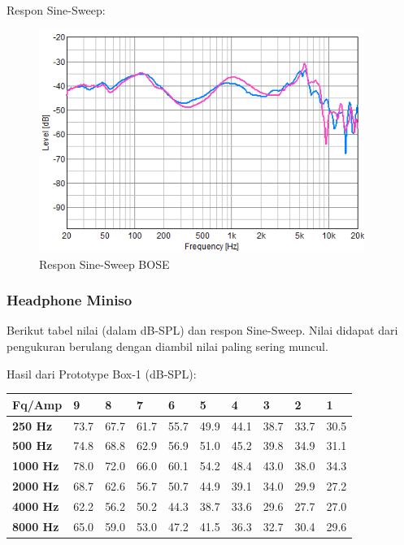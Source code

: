 \documentclass[12pt,]{article}
\begin{document}
	Respon Sine-Sweep:
	
	\begin{figure}[!ht]
		\centering
		\includegraphics[width=300pt]{images/respon/FP-Bose}
		\caption{Respon Sine-Sweep BOSE}
	\end{figure}

	\newpage
	\subsubsection{Headphone Miniso}
	
	Berikut tabel nilai (dalam dB-SPL) dan respon Sine-Sweep.
	Nilai didapat dari pengukuran berulang dengan diambil nilai paling sering muncul.
	
	Hasil dari Prototype Box-1 (dB-SPL):
	
	\begin{center}
		\begin{tabular}{|l|l|l|l|l|l|l|l|l|l|}
			\hline
			\textbf{Fq/Amp}  & \textbf{9} & \textbf{8} & \textbf{7} & \textbf{6} & \textbf{5} & \textbf{4} & \textbf{3} & \textbf{2} & \textbf{1} \\ \hline
			\textbf{250 Hz}  & 73.7       & 67.7       & 61.7       & 55.7       & 49.9       & 44.1       & 38.7       & 33.7       & 30.5       \\ \hline
			\textbf{500 Hz}  & 74.8       & 68.8       & 62.9       & 56.9       & 51.0       & 45.2       & 39.8       & 34.9       & 31.1       \\ \hline
			\textbf{1000 Hz} & 78.0       & 72.0       & 66.0       & 60.1       & 54.2       & 48.4       & 43.0       & 38.0       & 34.3       \\ \hline
			\textbf{2000 Hz} & 68.7       & 62.6       & 56.7       & 50.7       & 44.9       & 39.1       & 34.0       & 29.9       & 27.2       \\ \hline
			\textbf{4000 Hz} & 62.2       & 56.2       & 50.2       & 44.3       & 38.7       & 33.6       & 29.6       & 27.7       & 27.0       \\ \hline
			\textbf{8000 Hz} & 65.0       & 59.0       & 53.0       & 47.2       & 41.5       & 36.3       & 32.7       & 30.4       & 29.6       \\ \hline
		\end{tabular}
	\end{center}
	
\end{document}
